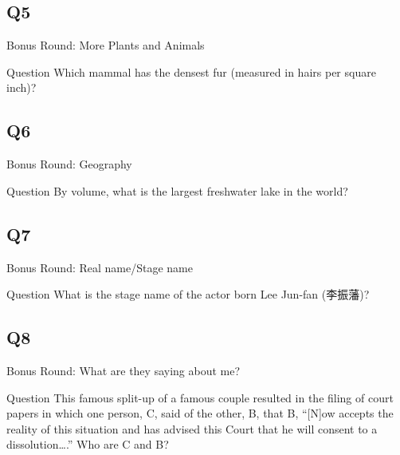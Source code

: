 \documentclass[11pt]{beamer}
\begin{document}
\subsection*{Q5}
\begin{frame}[t]{Bonus Round: More Plants and Animals}
\begin{block}{Question}
Which mammal has the densest fur (measured in hairs per square inch)?
\end{block}
\end{frame}
\subsection*{Q6}
\begin{frame}[t]{Bonus Round: Geography}
\begin{block}{Question}
By volume, what is the largest freshwater lake in the world?
\end{block}
\end{frame}
\subsection*{Q7}
\begin{frame}[t]{Bonus Round: Real name/Stage name}
\begin{block}{Question}
What is the stage name of the actor born Lee Jun-fan (李振藩)?
\end{block}
\end{frame}
\subsection*{Q8}
\begin{frame}[t]{Bonus Round: What are they saying about me?}
\begin{block}{Question}
This famous split-up of a famous couple resulted in the filing of court papers in which one person, C\textunderscore{}\textunderscore{}\textunderscore{}\textunderscore{}\textunderscore{}, said of the other, B\textunderscore{}\textunderscore{}\textunderscore{}\textunderscore{}\textunderscore{}, that B\textunderscore{}\textunderscore{}\textunderscore{}\textunderscore{}\textunderscore{}, ``[N]ow accepts the reality of this situation and has advised this Court that he will consent to a dissolution\ldots{}.'' Who are C\textunderscore{}\textunderscore{}\textunderscore{}\textunderscore{}\textunderscore{} and B\textunderscore{}\textunderscore{}\textunderscore{}\textunderscore{}\textunderscore{}?
\end{block}
\end{frame}
\end{document}

